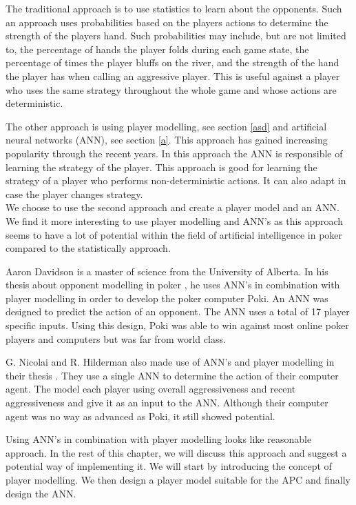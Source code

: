 The traditional approach is to use statistics to learn about the opponents. Such an approach uses probabilities based on the players actions to determine the strength of the players hand. Such probabilities may include, but are not limited to, the percentage of hands the player folds during each game state, the percentage of times the player bluffs on the river, and the strength of the hand the player has when calling an aggressive player. This is useful against a player who uses the same strategy throughout the whole game and whose actions are deterministic.

The other approach is using player modelling, see section \ref{asd} and artificial neural networks (ANN), see section \ref{a}. This approach has gained increasing popularity through the recent years. In this approach the ANN is responsible of learning the strategy of the player. This approach is good for learning the strategy of a player who performs non-deterministic actions. It can also adapt in case the player changes strategy.\\

We choose to use the second approach and create a player model and an ANN. We find it more interesting to use player modelling and ANN's as this approach seems to have a lot of potential within the field of artificial intelligence in poker compared to the statistically approach.

Aaron Davidson is a master of science from the University of Alberta. In his thesis about opponent modelling in poker \cite{opp-mod}, he uses ANN's in combination with player modelling in order to develop the poker computer Poki. An ANN was designed to predict the action of an opponent. The ANN uses a total of 17 player specific inputs. Using this design, Poki was able to win against most online poker players and computers but was far from world class.

G. Nicolai and R. Hilderman also made use of ANN's and player modelling in their thesis \cite{poker-agents}. They use a single ANN to determine the action of their computer agent. The model each player using overall aggressiveness and recent aggressiveness and give it as an input to the ANN. Although their computer agent was no way as advanced as Poki, it still showed potential.

Using ANN's in combination with player modelling looks like reasonable approach. In the rest of this chapter, we will discuss this approach and suggest a potential way of implementing it. We will start by introducing the concept of player modelling. We then design a player model suitable for the APC and finally design the ANN.

